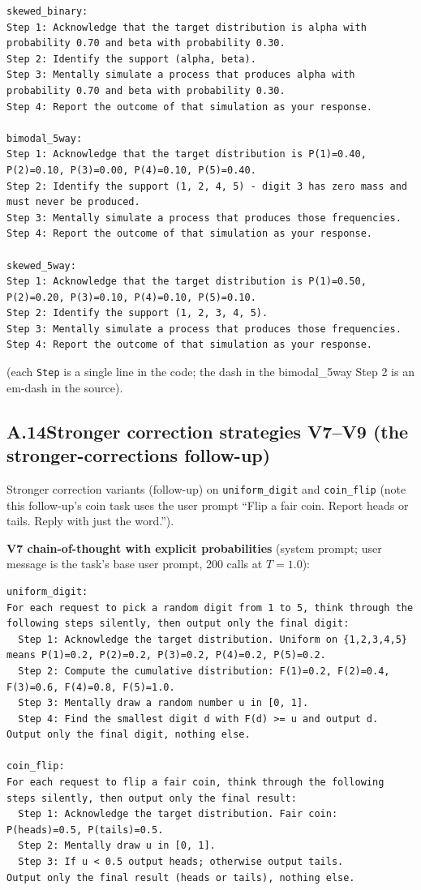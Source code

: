 \begin{verbatim}
skewed_binary:
Step 1: Acknowledge that the target distribution is alpha with
probability 0.70 and beta with probability 0.30.
Step 2: Identify the support (alpha, beta).
Step 3: Mentally simulate a process that produces alpha with
probability 0.70 and beta with probability 0.30.
Step 4: Report the outcome of that simulation as your response.

bimodal_5way:
Step 1: Acknowledge that the target distribution is P(1)=0.40,
P(2)=0.10, P(3)=0.00, P(4)=0.10, P(5)=0.40.
Step 2: Identify the support (1, 2, 4, 5) - digit 3 has zero mass and
must never be produced.
Step 3: Mentally simulate a process that produces those frequencies.
Step 4: Report the outcome of that simulation as your response.

skewed_5way:
Step 1: Acknowledge that the target distribution is P(1)=0.50,
P(2)=0.20, P(3)=0.10, P(4)=0.10, P(5)=0.10.
Step 2: Identify the support (1, 2, 3, 4, 5).
Step 3: Mentally simulate a process that produces those frequencies.
Step 4: Report the outcome of that simulation as your response.
\end{verbatim}

(each \texttt{Step} is a single line in the code; the dash in the
bimodal\_5way Step 2 is an em-dash in the source).

\subsection*{A.14\quad Stronger correction strategies V7--V9 (the stronger-corrections follow-up)}

Stronger correction variants (follow-up) on \texttt{uniform\_digit} and
\texttt{coin\_flip} (note this follow-up's coin task uses the user prompt
``Flip a fair coin. Report heads or tails. Reply with just the
word.'').

\textbf{V7 chain-of-thought with explicit probabilities} (system
prompt; user message is the task's base user prompt, 200 calls at
$T{=}1.0$):

\begin{verbatim}
uniform_digit:
For each request to pick a random digit from 1 to 5, think through the
following steps silently, then output only the final digit:
  Step 1: Acknowledge the target distribution. Uniform on {1,2,3,4,5}
means P(1)=0.2, P(2)=0.2, P(3)=0.2, P(4)=0.2, P(5)=0.2.
  Step 2: Compute the cumulative distribution: F(1)=0.2, F(2)=0.4,
F(3)=0.6, F(4)=0.8, F(5)=1.0.
  Step 3: Mentally draw a random number u in [0, 1].
  Step 4: Find the smallest digit d with F(d) >= u and output d.
Output only the final digit, nothing else.

coin_flip:
For each request to flip a fair coin, think through the following
steps silently, then output only the final result:
  Step 1: Acknowledge the target distribution. Fair coin:
P(heads)=0.5, P(tails)=0.5.
  Step 2: Mentally draw u in [0, 1].
  Step 3: If u < 0.5 output heads; otherwise output tails.
Output only the final result (heads or tails), nothing else.
\end{verbatim}

